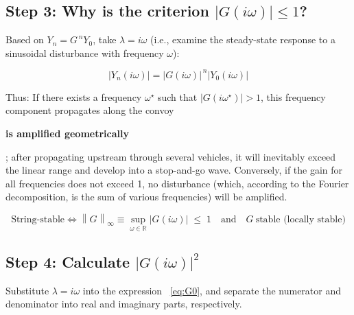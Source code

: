 \documentclass[11pt,a4paper,openany]{book}
\numberwithin{equation}{chapter}
\numberwithin{figure}{chapter}
\numberwithin{table}{chapter}
\begin{document}
\subsection{Step 3: Why is the criterion $\left|G(i\omega)\right|\le1$?}










Based on $Y_n = G^{\,n}Y_0$, take $\lambda = i\omega$ (i.e., examine the steady-state response to a sinusoidal disturbance with frequency $\omega$):

\begin{equation}
\left|Y_n(i\omega)\right| = \left|G(i\omega)\right|^{\,n}\left|Y_0(i\omega)\right|
\end{equation}




Thus: If there exists a frequency $\omega^\star$ such that $\left|G(i\omega^\star)\right|>1$, this frequency component propagates along the convoy




\textbf{is amplified geometrically}




; after propagating upstream through several vehicles, it will inevitably exceed the linear range and develop into a stop-and-go wave. Conversely, if the gain for all frequencies does not exceed 1, no disturbance (which, according to the Fourier decomposition, is the sum of various frequencies) will be amplified.










\begin{tcolorbox}[keybox,title=\textbf{Strict Definition of Linear Stability}]
\[
\text{String-stable}
\iff
\left\|G\right\|_{\infty} \equiv \sup_{\omega\in\mathbb{R}}\left|G(i\omega)\right| \;\le\; 1
\quad\text{and}\quad G\ \text{stable (locally stable)}
\]
\end{tcolorbox}

\subsection{Step 4: Calculate $\left|G(i\omega)\right|^2$}





Substitute $\lambda = i\omega$ into the expression ~\eqref{eq:G0}, and separate the numerator and denominator into real and imaginary parts, respectively.
\end{document}
